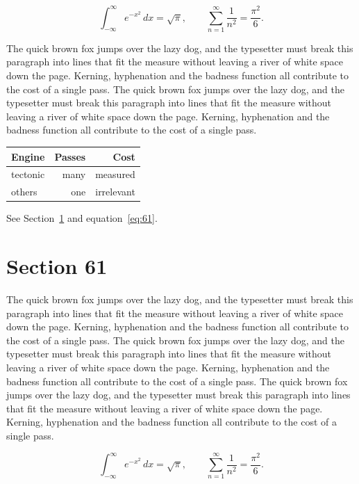 \documentclass{article}
\begin{document}
\begin{equation}\label{eq:60}
\int_{-\infty}^{\infty} e^{-x^{2}}\,dx = \sqrt{\pi}, \qquad
\sum_{n=1}^{\infty} \frac{1}{n^{2}} = \frac{\pi^{2}}{6}.
\end{equation}

The quick brown fox jumps over the lazy dog, and the typesetter must break this paragraph into lines that fit the measure without leaving a river of white space down the page. Kerning, hyphenation and the badness function all contribute to the cost of a single pass. The quick brown fox jumps over the lazy dog, and the typesetter must break this paragraph into lines that fit the measure without leaving a river of white space down the page. Kerning, hyphenation and the badness function all contribute to the cost of a single pass. 

\begin{center}
\begin{tabular}{lrr}
\toprule
Engine & Passes & Cost \\
\midrule
tectonic & many & measured \\
others & one & irrelevant \\
\bottomrule
\end{tabular}
\end{center}

See Section~\ref{sec:61} and equation~\eqref{eq:61}.
\section{Section 61}
\label{sec:61}
The quick brown fox jumps over the lazy dog, and the typesetter must break this paragraph into lines that fit the measure without leaving a river of white space down the page. Kerning, hyphenation and the badness function all contribute to the cost of a single pass. The quick brown fox jumps over the lazy dog, and the typesetter must break this paragraph into lines that fit the measure without leaving a river of white space down the page. Kerning, hyphenation and the badness function all contribute to the cost of a single pass. The quick brown fox jumps over the lazy dog, and the typesetter must break this paragraph into lines that fit the measure without leaving a river of white space down the page. Kerning, hyphenation and the badness function all contribute to the cost of a single pass. 

\begin{equation}\label{eq:61}
\int_{-\infty}^{\infty} e^{-x^{2}}\,dx = \sqrt{\pi}, \qquad
\sum_{n=1}^{\infty} \frac{1}{n^{2}} = \frac{\pi^{2}}{6}.
\end{equation}
\end{document}
